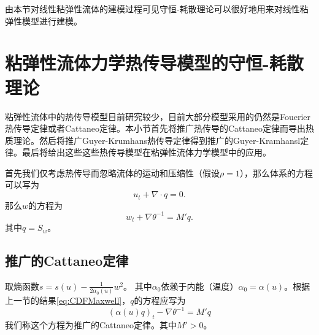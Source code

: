 	由本节对线性粘弹性流体的建模过程可见守恒-耗散理论可以很好地用来对线性粘弹性模型进行建模。

	\section{粘弹性流体力学热传导模型的守恒-耗散理论}
	粘弹性流体中的热传导模型目前研究较少，目前大部分模型采用的仍然是Fouerier热传导定律或者Cattaneo定律。本小节首先将推广热传导的Cattaneo定律而导出热质理论。然后将推广Guyer-Krumhans热传导定律得到推广的Guyer-Kramhansl定律。最后将给出这些这些热传导模型在粘弹性流体力学模型中的应用。

首先我们仅考虑热传导而忽略流体的运动和压缩性（假设$\rho = 1$），那么体系的方程可以写为
\begin{equation*}
	 u_t  + \nabla \cdot q = 0 .	
\end{equation*}
那么$w$的方程为
\begin{equation*}
	 w_t + \nabla \theta^{-1} = M' q. 
\end{equation*}
其中$q = S_w$。

\subsection{推广的Cattaneo定律}

取熵函数$s = s(u)  -\frac{1}{2 \alpha_0(u)} w^2$。
其中$\alpha_0$依赖于内能（温度）$\alpha_0=\alpha(u)$。根据上一节的结果\eqref{eq:CDFMaxwell}，$q$的方程应写为
\begin{equation*}
({\alpha(u)}{q})_t-\nabla \theta^{-1}= M'{q}
\end{equation*}
我们称这个方程为推广的Cattaneo定律。其中$M'>0$。

